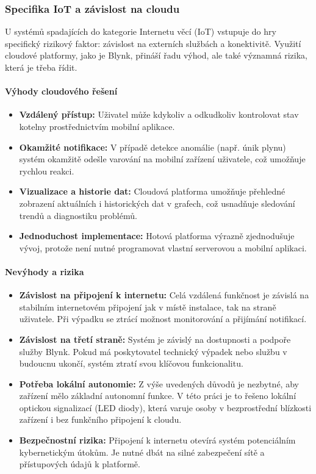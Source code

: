 \documentclass[12pt, twoside]{article} %
\begin{document}
\subsubsection{Specifika IoT a závislost na cloudu}
U systémů spadajících do kategorie Internetu věcí (IoT) vstupuje do hry specifický rizikový faktor: závislost na externích službách a konektivitě. Využití cloudové platformy, jako je Blynk, přináší řadu výhod, ale také významná rizika, která je třeba řídit.

\paragraph*{Výhody cloudového řešení}
\begin{itemize}
    \item \textbf{Vzdálený přístup:} Uživatel může kdykoliv a odkudkoliv kontrolovat stav kotelny prostřednictvím mobilní aplikace.
    \item \textbf{Okamžité notifikace:} V případě detekce anomálie (např. únik plynu) systém okamžitě odešle varování na mobilní zařízení uživatele, což umožňuje rychlou reakci.
    \item \textbf{Vizualizace a historie dat:} Cloudová platforma umožňuje přehledné zobrazení aktuálních i historických dat v grafech, což usnadňuje sledování trendů a diagnostiku problémů.
    \item \textbf{Jednoduchost implementace:} Hotová platforma výrazně zjednodušuje vývoj, protože není nutné programovat vlastní serverovou a mobilní aplikaci.
\end{itemize}

\paragraph*{Nevýhody a rizika}
\begin{itemize}
    \item \textbf{Závislost na připojení k internetu:} Celá vzdálená funkčnost je závislá na stabilním internetovém připojení jak v místě instalace, tak na straně uživatele. Při výpadku se ztrácí možnost monitorování a přijímání notifikací.
    \item \textbf{Závislost na třetí straně:} Systém je závislý na dostupnosti a podpoře služby Blynk. Pokud má poskytovatel technický výpadek nebo službu v budoucnu ukončí, systém ztratí svou klíčovou funkcionalitu.
    \item \textbf{Potřeba lokální autonomie:} Z výše uvedených důvodů je nezbytné, aby zařízení mělo základní autonomní funkce. V této práci je to řešeno lokální optickou signalizací (LED diody), která varuje osoby v bezprostřední blízkosti zařízení i bez funkčního připojení k cloudu.
    \item \textbf{Bezpečnostní rizika:} Připojení k internetu otevírá systém potenciálním kybernetickým útokům. Je nutné dbát na silné zabezpečení sítě a přístupových údajů k platformě.
\end{itemize}
\end{document}
